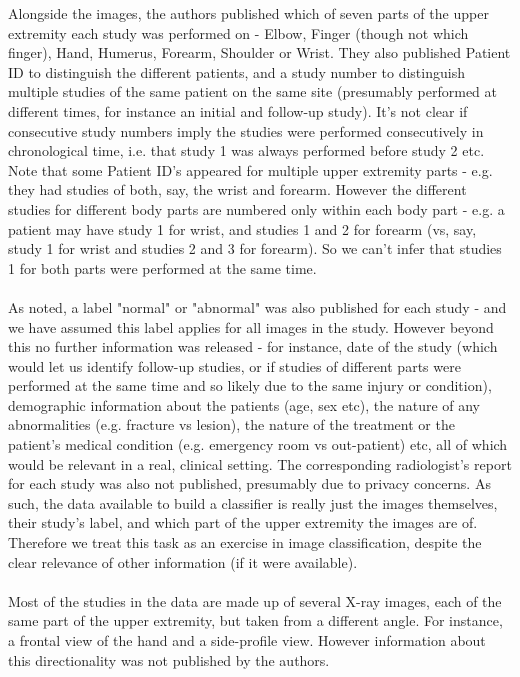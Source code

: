 \documentclass[11pt]{article} %
\theoremstyle{plain}
\theoremstyle{definition}
\begin{document}
Alongside the images, the authors published which of seven parts of the upper extremity each study was performed on - Elbow, Finger (though not which finger), Hand, Humerus, Forearm, Shoulder or Wrist. They also published Patient ID to distinguish the different patients, and a study number to distinguish multiple studies of the same patient on the same site (presumably performed at different times, for instance an initial and follow-up study). It's not clear if consecutive study numbers imply the studies were performed consecutively in chronological time, i.e. that study 1 was always performed before study 2 etc. Note that some Patient ID's appeared for multiple upper extremity parts - e.g. they had studies of both, say, the wrist and forearm. However the different studies for different body parts are numbered only within each body part - e.g. a patient may have study 1 for wrist, and studies 1 and 2 for forearm (vs, say, study 1 for wrist and studies 2 and 3 for forearm). So we can't infer that studies 1 for both parts were performed at the same time. 
\\
\\
\noindent
As noted, a label "normal" or "abnormal" was also published for each study - and we have assumed this label applies for all images in the study. However beyond this no further information was released - for instance, date of the study (which would let us identify follow-up studies, or if studies of different parts were performed at the same time and so likely due to the same injury or condition), demographic information about the patients (age, sex etc), the nature of any abnormalities (e.g. fracture vs lesion), the nature of the treatment or the patient's medical condition (e.g. emergency room vs out-patient) etc, all of which would be relevant in a real, clinical setting. The corresponding radiologist's report for each study was also not published, presumably due to privacy concerns. As such, the data available to build a classifier is really just the images themselves, their study's label, and which part of the upper extremity the images are of. Therefore we treat this task as an exercise in image classification, despite the clear relevance of other information (if it were available).
\\
\\
\noindent
Most of the studies in the data are made up of several X-ray images, each of the same part of the upper extremity, but taken from a different angle. For instance, a frontal view of the hand and a side-profile view. However information about this directionality was not published by the authors. 
\end{document}
